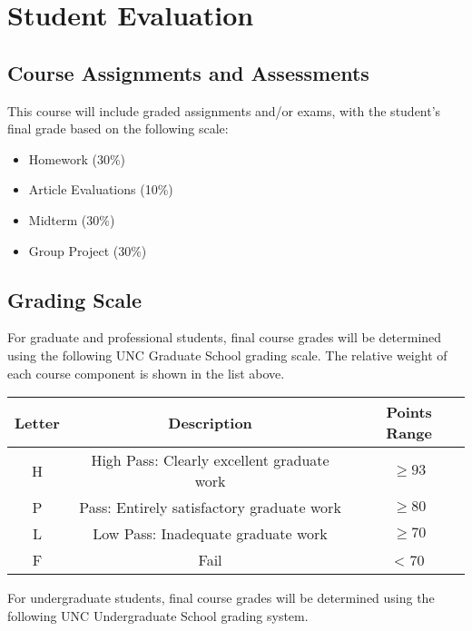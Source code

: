 \documentclass[11pt]{article}
\begin{document}
\section*{Student Evaluation}
\subsection*{Course Assignments and Assessments}
This course will include graded assignments and/or exams, with the student's final grade based on the following scale:
\begin{itemize}
\item Homework (30\%)
\item Article Evaluations (10\%)
\item Midterm (30\%)
\item Group Project (30\%)
\end{itemize}

\subsection*{Grading Scale}
For graduate and professional students, final course grades will be determined using the following UNC Graduate School grading scale.  The relative weight of each course component is shown in the list above. 

\begin{center}
\begin{tabular}{c|c|c}
Letter & Description & Points Range \\
\hline
H & High Pass: Clearly excellent graduate work & $\geq 93$ \\
P & Pass: Entirely satisfactory graduate work & $\geq 80$ \\
L & Low Pass: Inadequate graduate work & $\geq 70$ \\
F & Fail & < 70
\end{tabular}
\end{center}

For undergraduate students, final course grades will be determined using the following UNC Undergraduate School grading system.
\end{document}
